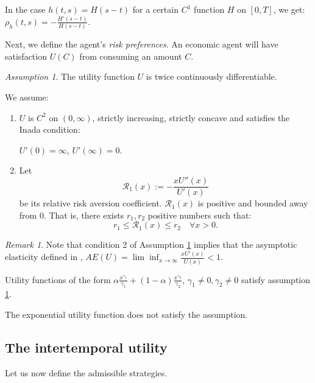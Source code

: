 \documentclass[11pt, psfig]{article}
\theoremstyle{definition}
\theoremstyle{remark}
\newtheorem{remark}[theorem]{Remark}
\newtheorem{assumption}[theorem]{Assumption}
\numberwithin{equation}{section}
\newcommand{\be}{\begin{equation}}
\newcommand{\ee}{\end{equation}}
\begin{document}
In the case $h(t,s)=H(s-t)$ for a certain $C^1$ function $H$ on $[0,T]$, we get:
$\rho_h(t,s)=-\frac{H'(s-t)}{H(s-t)}$.

Next, we define the agent's \emph{risk preferences}.
An economic agent will have satisfaction $U(C)$ from consuming an amount $C$. 

\begin{assumption}\label{ass_U}
The utility function $U$ is twice continuously differentiable.


We assume:
\begin{enumerate}
\item $U$ is $C^2$ on $(0,\infty)$, strictly increasing, strictly concave and satisfies the Inada condition: 

$U'(0)=\infty$, $U'(\infty)=0$.
\item Let $$\mathcal{R}_1(x):=-\frac{x U''(x)}{U'(x)}$$ be its relative risk aversion coefficient. $\mathcal{R}_1(x)$ is positive and bounded away from 0. That is, there exists $r_1, r_2 $ positive numbers such that:
\be 
r_1 \leq \mathcal{R}_1(x) \leq r_2 \quad \forall x>0.
\ee
\end{enumerate}

\end{assumption}
\begin{remark}

 Note that condition 2 of Assumption \ref{ass_U} implies that the asymptotic elasticity defined in \cite{Kr_Sc1}, \cite{Sc1} \quad $AE(U)=\lim\inf_{x\rightarrow \infty} \frac{xU'(x)}{U(x)} <1$.

\end{remark}

Utility functions of the form $ \alpha \frac{x^{\gamma_1}}{\gamma_1}+ (1-\alpha) \frac{x^{\gamma_2}}{\gamma_2}$, $\gamma_1\neq 0, \gamma_2 \neq 0$ satisfy assumption \ref{ass_U}.

The exponential utility function does not satisfy the assumption.

\subsection{The intertemporal utility}
 Let us now define the admissible strategies.
\end{document}
